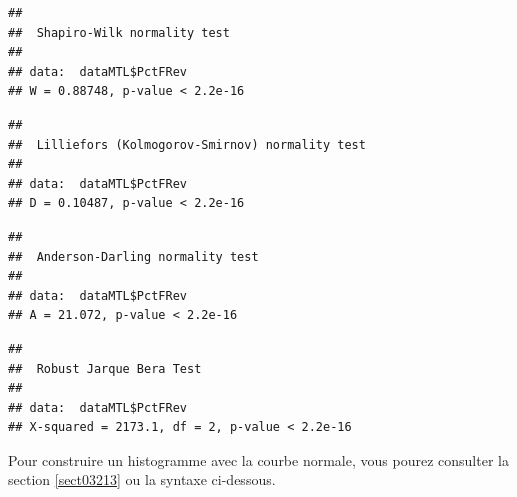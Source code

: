 \documentclass[
  11pt,
  french,
]{book}
\makeatletter
\newenvironment{Shaded}{\begin{snugshade}}{\end{snugshade}}
\newcommand{\KeywordTok}[1]{\textcolor[rgb]{0.13,0.29,0.53}{\textbf{#1}}}
\newcommand{\NormalTok}[1]{#1}
\newcommand{\OperatorTok}[1]{\textcolor[rgb]{0.81,0.36,0.00}{\textbf{#1}}}
\newenvironment{kframe}{%
\medskip{}
\setlength{\fboxsep}{.8em}
 \def\at@end@of@kframe{}%
 \ifinner\ifhmode%
  \def\at@end@of@kframe{\end{minipage}}%
  \begin{minipage}{\columnwidth}%
 \fi\fi%
 \def\FrameCommand##1{\hskip\@totalleftmargin \hskip-\fboxsep
 \colorbox{shadecolor}{##1}\hskip-\fboxsep
     \hskip-\linewidth \hskip-\@totalleftmargin \hskip\columnwidth}%
 \MakeFramed {\advance\hsize-\width
   \@totalleftmargin\z@ \linewidth\hsize
   \@setminipage}}%
 {\par\unskip\endMakeFramed%
 \at@end@of@kframe}
\renewenvironment{Shaded}{\begin{kframe}}{\end{kframe}}
\makeatother
\begin{document}
\begin{Shaded}
\end{Shaded}

\begin{verbatim}
## 
##  Shapiro-Wilk normality test
## 
## data:  dataMTL$PctFRev
## W = 0.88748, p-value < 2.2e-16
\end{verbatim}

\begin{Shaded}
\end{Shaded}

\begin{verbatim}
## 
##  Lilliefors (Kolmogorov-Smirnov) normality test
## 
## data:  dataMTL$PctFRev
## D = 0.10487, p-value < 2.2e-16
\end{verbatim}

\begin{Shaded}
\end{Shaded}

\begin{verbatim}
## 
##  Anderson-Darling normality test
## 
## data:  dataMTL$PctFRev
## A = 21.072, p-value < 2.2e-16
\end{verbatim}

\begin{Shaded}
\end{Shaded}

\begin{verbatim}
## 
##  Robust Jarque Bera Test
## 
## data:  dataMTL$PctFRev
## X-squared = 2173.1, df = 2, p-value < 2.2e-16
\end{verbatim}

Pour construire un histogramme avec la courbe normale, vous pourez consulter la section \ref{sect03213} ou la syntaxe ci-dessous.
\end{document}
